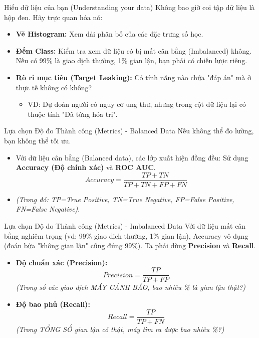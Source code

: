 \documentclass[aspectratio=169]{beamer}
\begin{document}
\begin{frame}{Hiểu dữ liệu của bạn (Understanding your data)}
    Không bao giờ coi tập dữ liệu là hộp đen. Hãy trực quan hóa nó:
    \begin{itemize}
        \item \textbf{Vẽ Histogram:} Xem dải phân bố của các đặc trưng số học.
        \item \textbf{Đếm Class:} Kiểm tra xem dữ liệu có bị mất cân bằng (Imbalanced) không. Nếu có 99\% là giao dịch thường, 1\% gian lận, bạn phải có chiến lược riêng.
        \item \textbf{Rò rỉ mục tiêu (Target Leaking):} Có tính năng nào chứa "đáp án" mà ở thực tế không có không? 
        \begin{itemize}
            \item VD: Dự đoán người có nguy cơ ung thư, nhưng trong cột dữ liệu lại có thuộc tính "Đã từng hóa trị".
        \end{itemize}
    \end{itemize}
\end{frame}

\begin{frame}{Lựa chọn Độ đo Thành công (Metrics) - Balanced Data}
    Nếu không thể đo lường, bạn không thể tối ưu.
    \begin{itemize}
        \item Với dữ liệu cân bằng (Balanced data), các lớp xuất hiện đồng đều: Sử dụng \textbf{Accuracy (Độ chính xác)} và \textbf{ROC AUC}.
        \begin{equation}
            Accuracy = \frac{TP + TN}{TP + TN + FP + FN}
        \end{equation}
        \item \textit{(Trong đó: TP=True Positive, TN=True Negative, FP=False Positive, FN=False Negative)}.
    \end{itemize}
\end{frame}

\begin{frame}{Lựa chọn Độ đo Thành công (Metrics) - Imbalanced Data}
    Với dữ liệu mất cân bằng nghiêm trọng (vd: 99\% giao dịch thường, 1\% gian lận), Accuracy vô dụng (đoán bừa "không gian lận" cũng đúng 99\%). Ta phải dùng \textbf{Precision} và \textbf{Recall}.
    \begin{itemize}
        \item \textbf{Độ chuẩn xác (Precision):}
        \begin{equation}
            Precision = \frac{TP}{TP + FP}
        \end{equation}
        \textit{(Trong số các giao dịch MÁY CẢNH BÁO, bao nhiêu \% là gian lận thật?)}
        
        \item \textbf{Độ bao phủ (Recall):}
        \begin{equation}
            Recall = \frac{TP}{TP + FN}
        \end{equation}
        \textit{(Trong TỔNG SỐ gian lận có thật, máy tìm ra được bao nhiêu \%?)}
    \end{itemize}
\end{frame}
\end{document}
